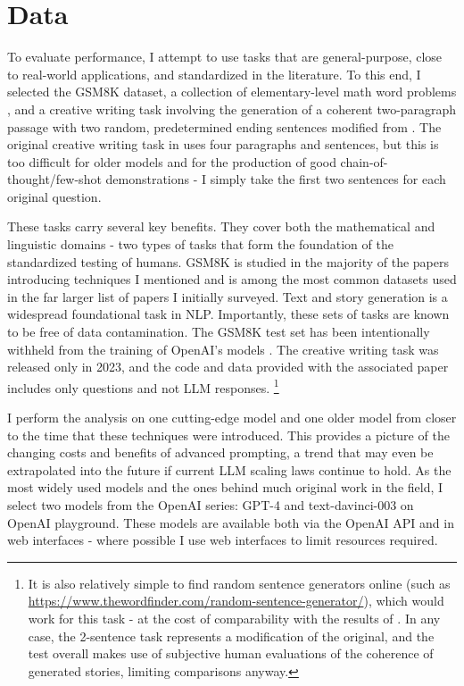 \documentclass[11pt]{article}
\begin{document}
\section*{Data}

To evaluate performance, I attempt to use tasks that are general-purpose, close to real-world applications, and standardized in the literature. To this end, I selected the GSM8K dataset, a collection of elementary-level math word problems \cite{cobbe_training_2021}, and a creative writing task involving the generation of a coherent two-paragraph passage with two random, predetermined ending sentences modified from \citealp{yao_tree_2023}. The original creative writing task in \citealp{yao_tree_2023} uses four paragraphs and sentences, but this is too difficult for older models and for the production of good chain-of-thought/few-shot demonstrations - I simply take the first two sentences for each original question. 

These tasks carry several key benefits. They cover both the mathematical and linguistic domains - two types of tasks that form the foundation of the standardized testing of humans. GSM8K is studied in the majority of the papers introducing techniques I mentioned and is among the most common datasets used in the far larger list of papers I initially surveyed. Text and story generation is a widespread foundational task in NLP. Importantly, these sets of tasks are known to be free of data contamination. The GSM8K test set has been intentionally withheld from the training of OpenAI's models \cite{openai_gpt-4_2023}. The creative writing task was released only in 2023, and the code and data provided with the associated paper includes only questions and not LLM responses. \footnote{It is also relatively simple to find random sentence generators online (such as \url{https://www.thewordfinder.com/random-sentence-generator/}), which would work for this task - at the cost of comparability with the results of \cite{yao_tree_2023}. In any case, the 2-sentence task represents a modification of the original, and the test overall makes use of subjective human evaluations of the coherence of generated stories, limiting comparisons anyway.}

I perform the analysis on one cutting-edge model and one older model from closer to the time that these techniques were introduced. This provides a picture of the changing costs and benefits of advanced prompting, a trend that may even be extrapolated into the future if current LLM scaling laws continue to hold. As the most widely used models and the ones behind much original work in the field, I select two models from the OpenAI series: GPT-4 and text-davinci-003 on OpenAI playground. These models are available both via the OpenAI API and in web interfaces - where possible I use web interfaces to limit resources required.
\end{document}
